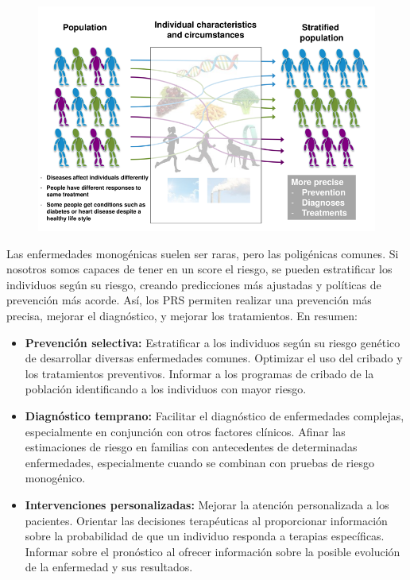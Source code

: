 \begin{figure}[htbp]
\centering
\includegraphics[width = 0.8 \textwidth]{figs/Imagen2.png}
\end{figure}

Las enfermedades monogénicas suelen ser raras, pero las poligénicas comunes. Si nosotros somos capaces de tener en un score el riesgo, se pueden estratificar los individuos según su riesgo, creando predicciones más ajustadas y políticas de prevención más acorde. Así, los PRS permiten realizar una prevención más precisa, mejorar el diagnóstico, y mejorar los tratamientos. En resumen:
\begin{itemize}
\item \textbf{Prevención selectiva:}
Estratificar a los individuos según su riesgo genético de desarrollar diversas enfermedades comunes.
Optimizar el uso del cribado y los tratamientos preventivos.
Informar a los programas de cribado de la población identificando a los individuos con mayor riesgo.

\item \textbf{Diagnóstico temprano:}
Facilitar el diagnóstico de enfermedades complejas, especialmente en conjunción con otros factores clínicos.
Afinar las estimaciones de riesgo en familias con antecedentes de determinadas enfermedades, especialmente cuando se combinan con pruebas de riesgo monogénico.

\item \textbf{Intervenciones personalizadas:}
Mejorar la atención personalizada a los pacientes.
Orientar las decisiones terapéuticas al proporcionar información sobre la probabilidad de que un individuo responda a terapias específicas.
Informar sobre el pronóstico al ofrecer información sobre la posible evolución de la enfermedad y sus resultados.
\end{itemize}

